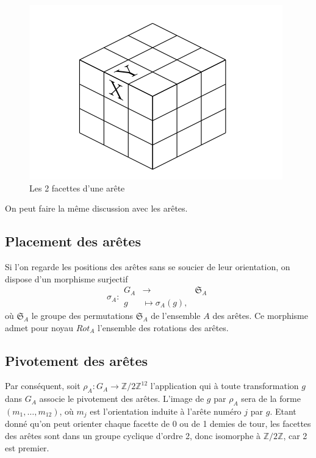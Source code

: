 \documentclass[french]{report}
\begin{document}
\begin{figure}
  \centering
  \includegraphics[scale=0.3]{figures/cube_arete.png}
  \caption{Les 2 facettes d'une arête}
  \label{cube_arete}
\end{figure}

On peut faire la même discussion avec les arêtes.

\subsection{Placement des arêtes}


 Si l'on regarde les positions des arêtes sans se soucier de leur orientation, on dispose d'un morphisme surjectif \begin{equation}\label{perm_aretes}
  \sigma_A:
    \begin{array}{lll}
    G_A & \longrightarrow & \mathfrak{S}_{A}  \\
    g & \longmapsto \sigma _{A}(g),
    \end{array}
\end{equation} où $\mathfrak{S}_{A} $ le groupe des permutations $\mathfrak{S}_{A} $ de l'ensemble $A$ des arêtes. Ce morphisme admet pour noyau $Rot_A$ l'ensemble des rotations des arêtes.

\subsection{Pivotement des arêtes}

Par conséquent, soit $\rho_A : G_A \to \mathbb{Z}/{ 2 }\mathbb{Z} ^{12} $ l'application qui à toute transformation $g$ dans $G_A$ associe le pivotement des arêtes. L'image de $g$ par $\rho_A $  sera de la forme $(m_1, \dots, m _{12})$, où $m_j$ est l'orientation induite à l'arête numéro $j$ par $g$. Etant donné qu'on peut orienter chaque facette de 0 ou de 1 demies de tour, les facettes des arêtes sont dans un groupe cyclique d'ordre 2, donc isomorphe à $\mathbb{Z}/{ 2 }\mathbb{Z}$, car 2 est premier.
\end{document}

